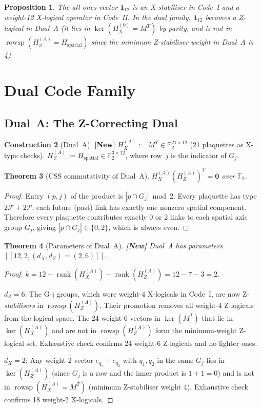 \documentclass[12pt,a4paper]{article}
\theoremstyle{plain}
\newtheorem{theorem}{Theorem}[section]
\newtheorem{proposition}[theorem]{Proposition}
\theoremstyle{definition}
\newtheorem{construction}[theorem]{Construction}
\theoremstyle{remark}
\newcommand{\GFtwo}{\mathbb{F}_2}
\newcommand{\rank}{\operatorname{rank}}
\newcommand{\rowsp}{\operatorname{rowsp}}
\newcommand{\FS}{\mathcal{F}}
\newcommand{\PS}{\mathcal{P}}
\newcommand{\NEW}{\textcolor{newcolor}{\textbf{[New]}}}
\begin{document}
\begin{proposition}\label{prop:all_ones_role}
The all-ones vector $\bm{1}_{12}$ is an X-\emph{stabiliser} in Code~I
and a weight-12 X-\emph{logical operator} in Code~II.
In the dual family, $\bm{1}_{12}$ becomes a Z-logical in Dual~A (it
lies in $\ker(H_X^{(0)} = M^T)$ by parity, and is not in
$\rowsp(H_Z^{(A)} = H_{\text{spatial}})$ since the minimum Z-stabiliser
weight in Dual~A is 4).
\end{proposition}

\section{Dual Code Family}\label{sec:dual}

\subsection{Dual~A: The Z-Correcting Dual}

\begin{construction}[Dual~A]\label{con:dualA}
\NEW\;
$H_X^{(A)} := M^T \in \GFtwo^{21\times12}$ (21 plaquettes as X-type checks).
$H_Z^{(A)} := H_{\text{spatial}} \in \GFtwo^{3\times12}$, where row~$j$
is the indicator of $G_j$.
\end{construction}

\begin{theorem}[CSS commutativity of Dual~A]\label{thm:dualA_comm}
$H_X^{(A)} (H_Z^{(A)})^T = \bm{0}$ over $\GFtwo$.
\end{theorem}
\begin{proof}
Entry $(p,j)$ of the product is $|p \cap G_j| \bmod 2$.
Every plaquette has type $2\FS+2\PS$; each future (past) link has
exactly one nonzero spatial component. Therefore every plaquette
contributes exactly 0 or 2 links to each spatial axis group $G_j$,
giving $|p \cap G_j| \in \{0,2\}$, which is always even. 
\end{proof}

\begin{theorem}[Parameters of Dual~A]\label{thm:dualA}
\NEW\; Dual~A has parameters $[[12, 2, (d_X,d_Z)=(2,6)]]$.
\end{theorem}
\begin{proof}
$k = 12 - \rank(H_X^{(A)}) - \rank(H_Z^{(A)}) = 12 - 7 - 3 = 2$.

$d_Z = 6$:
The G-j groups, which were weight-4 X-logicals in Code~I, are now
Z-\emph{stabilisers} in $\rowsp(H_Z^{(A)})$.
Their promotion removes all weight-4 Z-logicals from the logical space.
The 24 weight-6 vectors in $\ker(M^T)$ that lie in $\ker(H_X^{(A)})$
and are not in $\rowsp(H_Z^{(A)})$ form the minimum-weight Z-logical set.
Exhaustive check confirms 24 weight-6 Z-logicals and no lighter ones.

$d_X = 2$:
Any weight-2 vector $e_{q_1}+e_{q_2}$ with $q_1,q_2$ in the same $G_j$
lies in $\ker(H_Z^{(A)})$ (since $G_j$ is a row and the inner product
is $1+1=0$) and is not in $\rowsp(H_X^{(A)} = M^T)$ (minimum Z-stabiliser
weight 4). Exhaustive check confirms 18 weight-2 X-logicals.
\end{proof}
\end{document}

